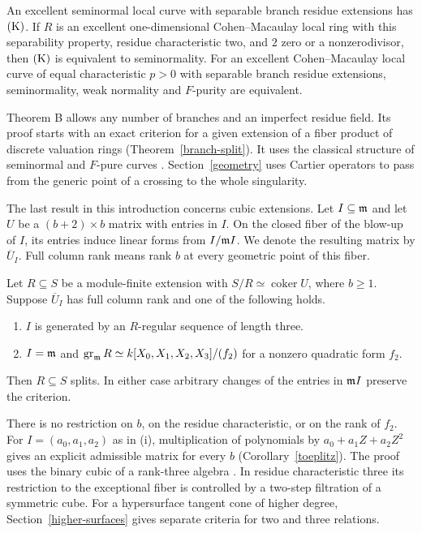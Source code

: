 \begin{mainb}
An excellent seminormal local curve with separable branch residue extensions has $\mathrm{(K)}$. If $R$ is an excellent one-dimensional Cohen--Macaulay local ring with this separability property, residue characteristic two, and $2$ zero or a nonzerodivisor, then $\mathrm{(K)}$ is equivalent to seminormality. For an excellent Cohen--Macaulay local curve of equal characteristic $p>0$ with separable branch residue extensions, seminormality, weak normality and $F$-purity are equivalent.
\end{mainb}

Theorem B allows any number of branches and an imperfect residue field. Its proof starts with an exact criterion for a given extension of a fiber product of discrete valuation rings (Theorem~\ref{branch-split}). It uses the classical structure of seminormal and $F$-pure curves \cite{Swan,GT,GW,Gib,EH,HS}. Section~\ref{geometry} uses Cartier operators to pass from the generic point of a crossing to the whole singularity.

The last result in this introduction concerns cubic extensions. Let $I\subseteq\mathfrak m$ and let $U$ be a $(b+2)\times b$ matrix with entries in $I$. On the closed fiber of the blow-up of $I$, its entries induce linear forms from $I/\mathfrak m I$. We denote the resulting matrix by $\overline U_I$. Full column rank means rank $b$ at every geometric point of this fiber.

\begin{mainc}
Let $R\subseteq S$ be a module-finite extension with $S/R\simeq\operatorname{coker}U$, where $b\ge1$. Suppose $\overline U_I$ has full column rank and one of the following holds.
\begin{enumerate}[label=\textup{(\roman*)}]
\item $I$ is generated by an $R$-regular sequence of length three.
\item $I=\mathfrak m$ and
$\operatorname{gr}_{\mathfrak m}R\simeq k[X_0,X_1,X_2,X_3]/(f_2)$ for a nonzero quadratic form $f_2$.
\end{enumerate}
Then $R\subseteq S$ splits. In either case arbitrary changes of the entries in $\mathfrak m I$ preserve the criterion.
\end{mainc}

There is no restriction on $b$, on the residue characteristic, or on the rank of $f_2$. For $I=(a_0,a_1,a_2)$ as in (i), multiplication of polynomials by $a_0+a_1Z+a_2Z^2$ gives an explicit admissible matrix for every $b$ (Corollary~\ref{toeplitz}). The proof uses the binary cubic of a rank-three algebra \cite[Theorem~2.1]{Wood}. In residue characteristic three its restriction to the exceptional fiber is controlled by a two-step filtration of a symmetric cube. For a hypersurface tangent cone of higher degree, Section~\ref{higher-surfaces} gives separate criteria for two and three relations.

